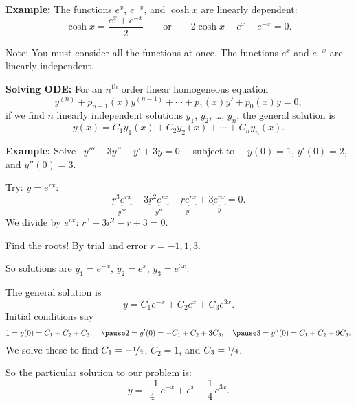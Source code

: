\documentclass[10pt,aspectratio=169]{beamer}
\begin{document}
\begin{frame}
\textbf{Example:}
The functions $e^x$, $e^{-x}$, and $\cosh x$ are linearly
dependent:
\pause
\[
\cosh x = \frac{e^x + e^{-x}}{2} 
\qquad
\text{or}
\qquad
2 \cosh x - e^x - e^{-x} = 0.
\]

\medskip
\pause

Note: You must consider all the functions at once.
The functions
$e^x$ and $e^{-x}$ are linearly independent.

\medskip
\pause

\textbf{Solving ODE:}
For an $n^{\text{th}}$ order linear homogeneous equation
\[
y^{(n)} + p_{n-1}(x)y^{(n-1)} + \cdots + p_1(x) y' + p_0(x) y = 0 ,
\]
if we find $n$ linearly independent solutions
$y_1$, $y_2$, \ldots, $y_n$, the general solution is
\[
y(x) = C_1 y_1(x) + C_2 y_2(x) + \cdots + C_n y_n(x)  .
\]
\end{frame}

\begin{frame}
\textbf{Example:}
Solve
~$y''' - 3 y'' - y' + 3y = 0$
~~subject to~~
$y(0) = 1$, $y'(0) = 2$, and $y''(0) = 3$.

\medskip
\pause

Try: $y = e^{rx}$:
\[
\underbrace{r^3 e^{rx}}_{y'''} - 3 \underbrace{r^2 e^{rx}}_{y''} -
\underbrace{r e^{rx}}_{y'} + 3 \underbrace{e^{rx}}_{y} = 0 .
\]
\pause
We divide by $e^{rx}$: \qquad
$r^3 - 3 r^2 - r + 3 = 0$.

\medskip
\pause

Find the roots! \pause By trial and error $r=-1,1,3$.

\medskip
\pause

So solutions are \quad $y_1 = e^{-x}$, \quad $y_2 = e^{x}$, \quad $y_3 =
e^{3x}$.

\medskip
\pause

The general solution is
\[
y = C_1 e^{-x} + C_2 e^{x} + C_3 e^{3x} .
\]
\pause
Initial conditions say
\[
1 = y(0)  = C_1 + C_2 + C_3 , \quad
\pause
2 = y'(0)  = -C_1 + C_2 + 3C_3 , \quad
\pause
3 = y''(0)  = C_1 + C_2 + 9C_3 .
\]
\pause
We solve these to find
$C_1 = -\nicefrac{1}{4}$, $C_2 = 1$, and $C_3 = \nicefrac{1}{4}$.

\medskip
\pause

So the particular solution to our problem is:
\[
y = \frac{-1}{4}\, e^{-x} + e^x + \frac{1}{4}\, e^{3x} .
\]
\end{frame}
\end{document}

